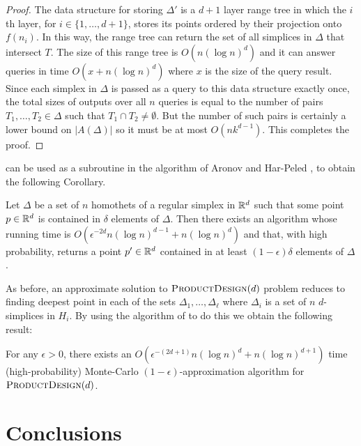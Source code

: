 \documentclass{llncs}
\newcommand{\eps}{\epsilon}
\begin{document}
\begin{proof}
  The data structure for storing $\Delta'$ is a $d+1$ layer range tree
  \cite{b75} in which the $i$th layer, for $i\in\{1,\ldots,d+1\}$,
  stores its points ordered by their projection onto $f(n_i)$.  In this
  way, the range tree can return the set of all simplices in $\Delta$ that
  intersect $T$.  The size of this range tree is $O(n(\log n)^{d})$
  and it can answer queries in time $O(x+n(\log n)^{d})$ where $x$
  is the size of the query result.  Since each simplex in $\Delta$
  is passed as a query to this data structure exactly once, the total
  sizes of outputs over all $n$ queries is equal to the number of
  pairs $T_1,\ldots,T_2\in\Delta$ such that $T_1\cap T_2\neq\emptyset$.
  But the number of such pairs is certainly a lower bound on $|A(\Delta)|$
  so it must be at most $O(nk^{d-1})$.  This completes the proof.
\end{proof}

 can be used as a subroutine in the
algorithm of Aronov and Har-Peled \cite[Theorem~3.3]{ah08}, to obtain
the following Corollary.

\begin{cor}
  Let $\Delta$ be a set of $n$ homothets of a regular simplex in $\mathbb{R}^d$
  such that some point $p\in\mathbb{R}^d$ is contained in $\delta$ elements
  of $\Delta$.  Then there exists an algorithm whose running time is
  $O(\eps^{-2d}n(\log n)^{d-1} + n(\log n)^d)$ and that, with high
  probability, returns a point $p'\in\mathbb{R}^{d}$ contained in at least
  $(1-\eps)\delta$ elements of $\Delta$.
\end{cor}

As before, an approximate solution to $\textsc{ProductDesign}(d)$ problem
reduces to finding deepest point in each of the sets
$\Delta_1,\ldots,\Delta_\ell$ where $\Delta_i$ is a set of $n$
$d$-simplices in $H_i$.  By using the algorithm of  to
do this we obtain the following result:

\begin{thm}
  For any $\eps >0$, there exists an $O(\eps^{-(2d+1)}n(\log n)^d + n(\log
  n)^{d+1})$ time (high-probability) Monte-Carlo $(1-\eps)$-approximation
  algorithm for $\textsc{ProductDesign}(d)$.
\end{thm}

\section{Conclusions}
\end{document}
